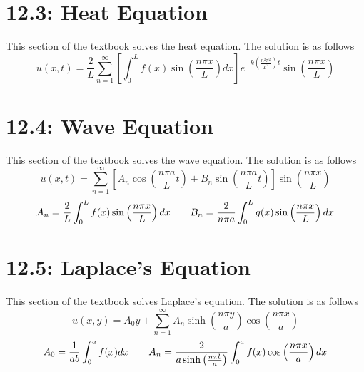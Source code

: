 \documentclass{article}
\begin{document}
\section*{12.3: Heat Equation}
This section of the textbook solves the heat equation. The solution is as follows
\[u(x,t)=\frac{2}{L}\sum_{n=1}^\infty\left[\int_0^Lf(x)\sin\left(\frac{n\pi x}{L}\right)dx\right]e^{-k\left(\frac{n^2\pi^2}{L^2}\right)t}\sin\left(\frac{n\pi x}{L}\right)\]
\section*{12.4: Wave Equation}
This section of the textbook solves the wave equation. The solution is as follows
\[u(x,t)=\sum_{n=1}^\infty\left[A_n\cos\left(\frac{n\pi a}{L}t\right)+B_n\sin\left(\frac{n\pi a}{L}t\right)\right]\sin\left(\frac{n\pi x}{L}\right)\]
\[A_n=\frac{2}{L}\int_0^Lf(x)\sin\left(\frac{n\pi x}{L}\right)dx\hspace{7 mm}B_n=\frac{2}{n\pi a}\int_0^Lg(x)\sin\left(\frac{n\pi x}{L}\right)dx\]
\section*{12.5: Laplace's Equation}
This section of the textbook solves Laplace's equation. The solution is as follows
\[u(x,y)=A_0y+\sum_{n=1}^\infty A_n\sinh\left(\frac{n\pi y}{a}\right)\cos\left(\frac{n\pi x}{a}\right)\]
\[A_0=\frac{1}{ab}\int_0^af(x)dx\hspace{7 mm}A_n=\frac{2}{a\sinh\left(\frac{n\pi b}{a}\right)}\int_0^af(x)\cos\left(\frac{n\pi x}{a}\right)dx\]
\end{document}
